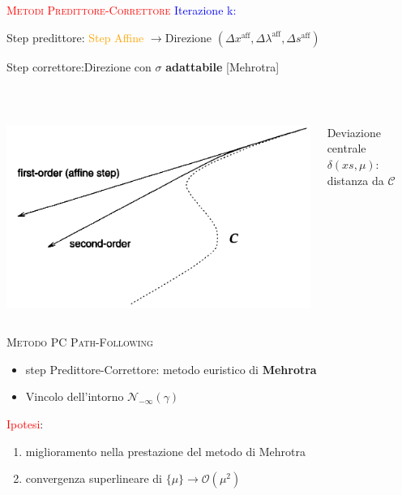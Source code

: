 \begin{frame}{\textsc{\LARGE \textcolor{red}{Metodi Predittore-Correttore}}}
\pause
\textcolor{blue}{Iterazione k:}
\pause
{}
\setcounter{elenco}{0}
\begin{list}{}{\setlength{\itemsep}{0.6cm}}
	\item Step predittore: \textcolor{orange}{Step Affine} $\rightarrow$\pause Direzione $(\Delta x^{\text{aff}}, \Delta \lambda^{\text{aff}},\Delta s^{\text{aff}})$
	\pause
	\item Step correttore:\pause \;\;Direzione con $\sigma$ \textbf{adattabile} [Mehrotra]
	\end{list}
\\[1 cm]
\pause
\begin{columns}
	\begin{column}{0.4\textwidth}
	\includegraphics[width=\columnwidth]{MEH.PNG}
\end{column}
\begin{column}{0.4\textwidth}
	Deviazione centrale $\delta(xs, \mu)$: distanza da $\mathcal{C}$
\end{column}
\end{columns}
\end{frame}


\begin{frame}[t]{\textsc{\LARGE \textcolor{sapphire}{Metodo PC Path-Following}}}
\begin{itemize}
\item step Predittore-Correttore: metodo euristico di \textbf{Mehrotra}
\item Vincolo dell'intorno $\mathcal{N}_{-\infty}(\gamma)$
\end{itemize}
\pause
\textcolor{red}{Ipotesi}: 
\begin{enumerate}
	\item miglioramento nella prestazione del metodo di Mehrotra
	\item convergenza superlineare di $\{\mu\}\rightarrow \mathcal{O}(\mu^{2})$
\end{enumerate}
\end{frame}

